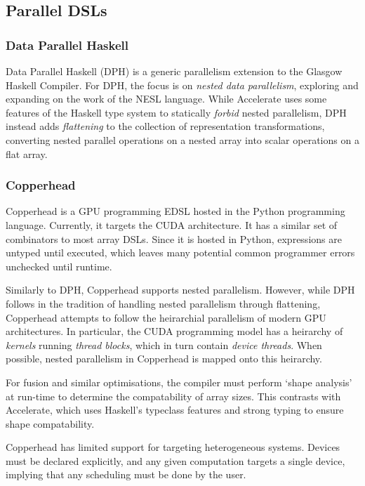 \documentclass[a4paper,12pt]{article}
\begin{document}
\subsection{Parallel DSLs}

\subsubsection*{Data Parallel Haskell}
Data Parallel Haskell (DPH) is a generic parallelism extension to the Glasgow Haskell Compiler.
For DPH, the focus is on \textit{nested data parallelism}, exploring and expanding on the work of the NESL language. \citep{chakravarty_data_2007}
While Accelerate uses some features of the Haskell type system to statically \textit{forbid} nested parallelism, DPH instead adds \textit{flattening} to the collection of representation transformations, converting nested parallel operations on a nested array into scalar operations on a flat array.

\subsubsection*{Copperhead}
Copperhead is a GPU programming EDSL hosted in the Python programming language. \citep{catanzaro_copperhead:_2011}
Currently, it targets the CUDA architecture.
It has a similar set of combinators to most array DSLs.
Since it is hosted in Python, expressions are untyped until executed, which leaves many potential common programmer errors unchecked until runtime.

Similarly to DPH, Copperhead supports nested parallelism.
However, while DPH follows in the tradition of handling nested parallelism through flattening, Copperhead attempts to follow the heirarchial parallelism of modern GPU architectures.
In particular, the CUDA programming model has a heirarchy of \textit{kernels} running \textit{thread blocks}, which in turn contain \textit{device threads}.
When possible, nested parallelism in Copperhead is mapped onto this heirarchy.

For fusion and similar optimisations, the compiler must perform `shape analysis' at run-time to determine the compatability of array sizes.
This contrasts with Accelerate, which uses Haskell's typeclass features and strong typing to ensure shape compatability.

Copperhead has limited support for targeting heterogeneous systems.
Devices must be declared explicitly, and any given computation targets a single device, implying that any scheduling must be done by the user.
\end{document}
